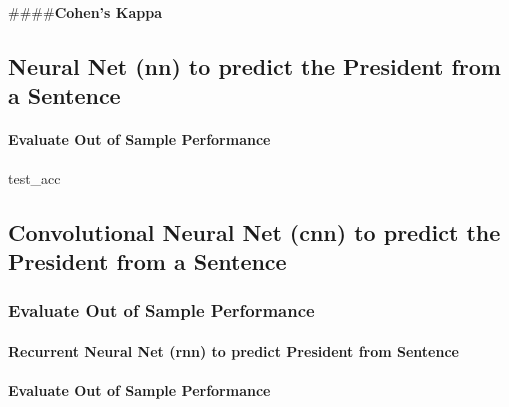 \documentclass[]{article}
\let\oldparagraph\paragraph
\renewcommand{\paragraph}[1]{\oldparagraph{#1}\mbox{}}
\begin{document}
\#\#\#\#\textbf{Cohen's Kappa}

\hypertarget{neural-net-nn-to-predict-the-president-from-a-sentence}{%
\subsection{\texorpdfstring{\textbf{Neural Net (nn) to predict the
President from a
Sentence}}{Neural Net (nn) to predict the President from a Sentence}}\label{neural-net-nn-to-predict-the-president-from-a-sentence}}

\hypertarget{evaluate-out-of-sample-performance}{%
\paragraph{\texorpdfstring{\textbf{Evaluate Out of Sample
Performance}}{Evaluate Out of Sample Performance}}\label{evaluate-out-of-sample-performance}}

test\_acc

\hypertarget{convolutional-neural-net-cnn-to-predict-the-president-from-a-sentence}{%
\subsection{\texorpdfstring{\textbf{Convolutional Neural Net (cnn) to
predict the President from a
Sentence}}{Convolutional Neural Net (cnn) to predict the President from a Sentence}}\label{convolutional-neural-net-cnn-to-predict-the-president-from-a-sentence}}

\hypertarget{evaluate-out-of-sample-performance-1}{%
\subsubsection{\texorpdfstring{\textbf{Evaluate Out of Sample
Performance}}{Evaluate Out of Sample Performance}}\label{evaluate-out-of-sample-performance-1}}

\hypertarget{recurrent-neural-net-rnn-to-predict-president-from-sentence}{%
\paragraph{\texorpdfstring{\textbf{Recurrent Neural Net (rnn) to predict
President from
Sentence}}{Recurrent Neural Net (rnn) to predict President from Sentence}}\label{recurrent-neural-net-rnn-to-predict-president-from-sentence}}

\hypertarget{evaluate-out-of-sample-performance-2}{%
\paragraph{\texorpdfstring{\textbf{Evaluate Out of Sample
Performance}}{Evaluate Out of Sample Performance}}\label{evaluate-out-of-sample-performance-2}}
\end{document}
